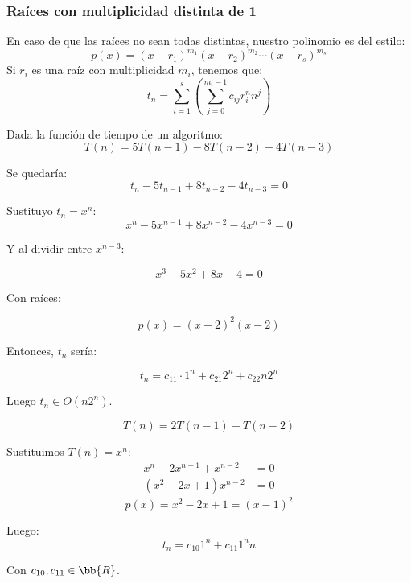 \subsubsection{Raíces con multiplicidad distinta de 1}
En caso de que las raíces no sean todas distintas, nuestro polinomio es del estilo:
\begin{equation*}
    p(x) = (x-r_1)^{m_1}(x-r_2)^{m_2}\cdots(x-r_s)^{m_s}
\end{equation*}
Si $r_i$ es una raíz con multiplicidad $m_i$, tenemos que:
\begin{equation*}
    t_n = \sum_{i=1}^s\left( \sum_{j = 0}^{m_i-1} c_{ij} r_i^n n^j\right)
\end{equation*}

\begin{ejemplo}
    Dada la función de tiempo de un algoritmo:
\begin{equation*}
    T(n) = 5T(n-1)-8T(n-2)+4T(n-3)
\end{equation*}

Se quedaría:
\begin{equation*}
    t_n - 5t_{n-1} +8t_{n-2}-4t_{n-3} = 0
\end{equation*}

Sustituyo $t_n = x^n $:
\begin{equation*}
    x^n -5x^{n-1} +8x^{n-2} -4x^{n-3} = 0
\end{equation*}

Y al dividir entre $x^{n-3}$:

\begin{equation*}
    x^3 - 5x^2 +8x-4 = 0
\end{equation*}

Con raíces:

\begin{equation*}
    p(x) = (x-2)^2 (x-2)
\end{equation*}

Entonces, $t_n$ sería:

\begin{equation*}
    t_n = c_{11} \cdot 1^n + c_{21} 2^n + c_{22} n2^n
\end{equation*}

Luego $t_n \in O(n2^n)$.
\end{ejemplo}

\begin{ejemplo}
\begin{equation*}
    T(n) = 2T(n-1)-T(n-2)
\end{equation*}

Sustituimos $T(n) = x^n$:
\begin{align*}
    x^n - 2x^{n-1} +x^{n-2} &= 0\\
    (x^2-2x+1)x^{n-2} &= 0
\end{align*}
\begin{equation*}
    p(x) = x^2-2x+1 = (x-1)^2
\end{equation*}

Luego:
\begin{equation*}
    t_n = c_{10}1^n + c_{11} 1^n n
\end{equation*}

Con $c_{10}, c_{11} \in \bb{R}$.

\end{ejemplo}

